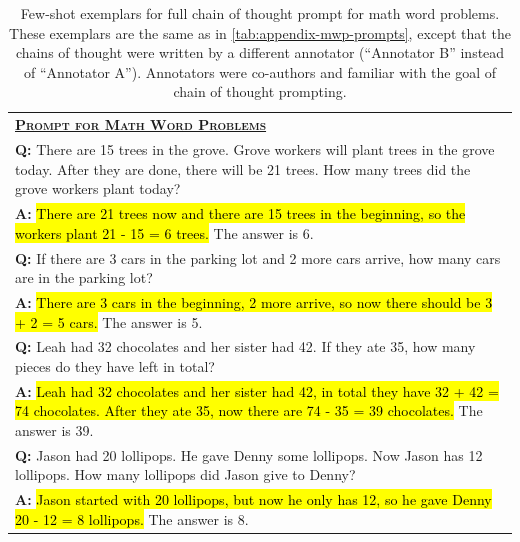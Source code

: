 \begingroup
\begin{table}[H]
    \centering
    \small
    \caption{
    Few-shot exemplars for full chain of thought prompt for math word problems. These exemplars are the same as in \cref{tab:appendix-mwp-prompts}, except that the chains of thought were written by a different annotator (``Annotator B'' instead of ``Annotator A'').
    Annotators were co-authors and familiar with the goal of chain of thought prompting.
    }
    \begin{tabular}{p{\linewidth}}
        \toprule
        \underline{\textbf{\textsc{Prompt for Math Word Problems}}} \\
        \vspace{-2mm}
        \textbf{Q:} There are 15 trees in the grove. Grove workers will plant trees in the grove today. After they are done, there will be 21 trees. How many trees did the grove workers plant today? \\
        \vspace{-1mm}
        \textbf{A:} \hl{There are 21 trees now and there are 15 trees in the beginning, so the workers plant 21 - 15 = 6 trees.} The answer is 6. \\
        \vspace{0mm}
        \textbf{Q:} If there are 3 cars in the parking lot and 2 more cars arrive, how many cars are in the parking lot? \\
        \vspace{-1mm}
        \textbf{A:} \hl{ There are 3 cars in the beginning, 2 more arrive, so now there should be 3 + 2 = 5 cars.}  The answer is 5. \\
        \vspace{0mm}
        \textbf{Q:} Leah had 32 chocolates and her sister had 42. If they ate 35, how many pieces do they have left in total? \\
        \vspace{-1mm}
        \textbf{A:} \hl{Leah had 32 chocolates and her sister had 42, in total they have 32 + 42 = 74 chocolates. After they ate 35, now there are 74 - 35 = 39 chocolates.} The answer is 39. \\
        \vspace{0mm}
        \textbf{Q:} Jason had 20 lollipops. He gave Denny some lollipops. Now Jason has 12 lollipops. How many lollipops did Jason give to Denny? \\
        \vspace{-1mm}
        \textbf{A:} \hl{Jason started with 20 lollipops, but now he only has 12, so he gave Denny 20 - 12 = 8 lollipops.} The answer is 8. \\

\end{tabular}
\end{table}
